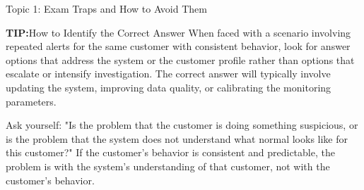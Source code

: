 \documentclass[8pt]{beamer}  %
\newcommand{\tip}{\textcolor{infoblue}{\textbf{TIP:}}}
\begin{document}
\begin{frame}{Topic 1: Exam Traps and How to Avoid Them}
		\vspace{0.2cm}
		\begin{block}{\large \tip How to Identify the Correct Answer}
			When faced with a scenario involving repeated alerts for the same customer with consistent behavior, look for answer options that address the system or the customer profile rather than options that escalate or intensify investigation. The correct answer will typically involve updating the system, improving data quality, or calibrating the monitoring parameters.
			
			Ask yourself: "Is the problem that the customer is doing something suspicious, or is the problem that the system does not understand what normal looks like for this customer?" If the customer's behavior is consistent and predictable, the problem is with the system's understanding of that customer, not with the customer's behavior.
		\end{block}
	\end{frame}
	
\end{document}
